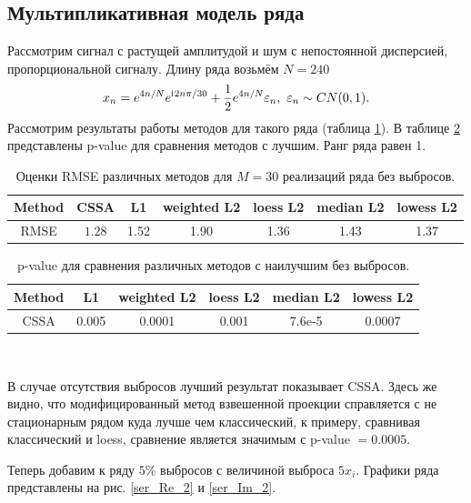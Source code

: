\documentclass[specialist,
               substylefile = spbu.rtx,
               subf,href,colorlinks=true, 12pt]{disser}
\begin{document}
\subsection{Мультипликативная модель ряда}

Рассмотрим сигнал с растущей амплитудой и шум с непостоянной дисперсией, пропорциональной сигналу.
Длину ряда возьмём $N = 240$
$$x_n = e^{4n/N} e^{\mathrm{i}\mkern1mu 2n\pi/30} + \frac{1}{2}e^{4n/N} \varepsilon_n, ~ \varepsilon_n \sim CN(0,1).$$
Рассмотрим результаты работы методов для такого ряда (таблица \ref{tab3}).  В таблице \ref{tab: pval3} представлены p-value для сравнения методов с лучшим. Ранг ряда равен 1.

\begin{table}[H]
	\begin{center}
		\caption{Оценки RMSE различных методов для $M = 30$ реализаций ряда без выбросов.}
		\label{tab3}
		\begin{tabular}{|c|c|c|c|c|c|c|}
			\hline
			Method 	& CSSA & L1 & weighted L2 & loess L2 & median L2 & lowess L2 \\
			\hline
			RMSE & $\mathbf{1.28}$  & 1.52  & 1.90 & 1.36 & 1.43 & 1.37\\
			\hline
		\end{tabular}
	\end{center}
\end{table}

\begin{table}[H]
	\caption{p-value для сравнения различных методов с наилучшим без выбросов.}
	\label{tab: pval3}
	\begin{center}
		\begin{tabular}{|c|c|c|c|c|c|}
			\hline
			Method & L1 & weighted L2 & loess L2 & median L2 & lowess L2  \\
			\hline
			CSSA & 0.005   & 0.0001 & 0.001  & 7.6e-5 & 0.0007  \\
			\hline
		\end{tabular} \\
	\end{center}
\end{table}

В случае отсутствия выбросов лучший результат показывает CSSA. Здесь же видно, что модифицированный метод взвешенной проекции справляется с не стационарным рядом куда лучше чем классический, к примеру, сравнивая классический и loess, сравнение является значимым с p-value $ = 0.0005$.

Теперь добавим к ряду $5\%$ выбросов с величиной выброса $5x_i$. Графики ряда представлены на рис. \ref{ser_Re_2} и \ref{ser_Im_2}.
\end{document}
